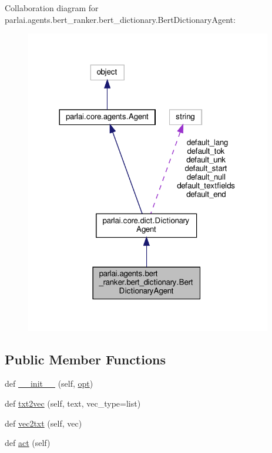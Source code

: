 Collaboration diagram for parlai.\+agents.\+bert\+\_\+ranker.\+bert\+\_\+dictionary.\+Bert\+Dictionary\+Agent\+:
\nopagebreak
\begin{figure}[H]
\begin{center}
\leavevmode
\includegraphics[width=305pt]{dc/da1/classparlai_1_1agents_1_1bert__ranker_1_1bert__dictionary_1_1BertDictionaryAgent__coll__graph}
\end{center}
\end{figure}
\subsection*{Public Member Functions}
\begin{DoxyCompactItemize}
\item 
def \hyperlink{classparlai_1_1agents_1_1bert__ranker_1_1bert__dictionary_1_1BertDictionaryAgent_aedf3441c187fc809926e490a9cab9875}{\+\_\+\+\_\+init\+\_\+\+\_\+} (self, \hyperlink{classparlai_1_1core_1_1dict_1_1DictionaryAgent_a6c0d7c9c31b38e99b747be88395d689f}{opt})
\item 
def \hyperlink{classparlai_1_1agents_1_1bert__ranker_1_1bert__dictionary_1_1BertDictionaryAgent_a407dcd1aa927f8065334a825b2d099d9}{txt2vec} (self, text, vec\+\_\+type=list)
\item 
def \hyperlink{classparlai_1_1agents_1_1bert__ranker_1_1bert__dictionary_1_1BertDictionaryAgent_a6269b15dc01bfaac5dd1b5da995f2f0f}{vec2txt} (self, vec)
\item 
def \hyperlink{classparlai_1_1agents_1_1bert__ranker_1_1bert__dictionary_1_1BertDictionaryAgent_a35cefbd011319119e4a395afd6618ac6}{act} (self)
\end{DoxyCompactItemize}
